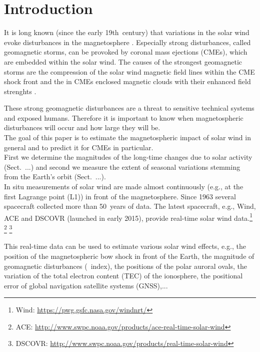 
\section{Introduction}
It is long known (since the early 19th~century) that variations in the solar wind evoke disturbances in the magnetosphere \citep{Bartels1962}. Especially strong disturbances, called geomagnetic storms, can be provoked by coronal mass ejections (CMEs), which are embedded within the solar wind. The causes of the strongest geomagnetic storms are the compression of the solar wind magnetic field lines within the CME shock front and the in CMEs enclosed magnetic clouds with their enhanced field strenghts \citep{Bothmer1993}.

These strong geomagnetic disturbances are a threat to sensitive technical systems and exposed humans. Therefore it is important to know when magnetospheric disturbances will occur and how large they will be.\\

The goal of this paper is to estimate the magnetospheric impact of solar wind in general and to predict it for CMEs in particular.\\


First we determine the magnitudes of the long-time \Kp{} changes due to solar activity (Sect.~...) and second we measure the extent of seasonal variations stemming from the Earth's orbit (Sect.~...).\\

In situ measurements of solar wind are made almost continuously (e.g., at the first Lagrange point (L1)) in front of the magnetosphere. Since 1963 several spacecraft collected more than 50~years of data. The latest spacecraft, e.g., Wind, ACE and DSCOVR (launched in early 2015), provide real-time solar wind data.\footnote{Wind: \url{https://pwg.gsfc.nasa.gov/windnrt/}} \footnote{ACE: \url{http://www.swpc.noaa.gov/products/ace-real-time-solar-wind}} \footnote{DSCOVR: \url{http://www.swpc.noaa.gov/products/real-time-solar-wind}}

This real-time data can be used to estimate various solar wind effects, e.g., the position of the magnetospheric bow shock in front of the Earth, the magnitude of geomagnetic disturbances (\Kp~index), the positions of the polar auroral ovals, the variation of the total electron content (TEC) of the ionosphere, the positional error of global navigation satellite systems (GNSS),...\\

